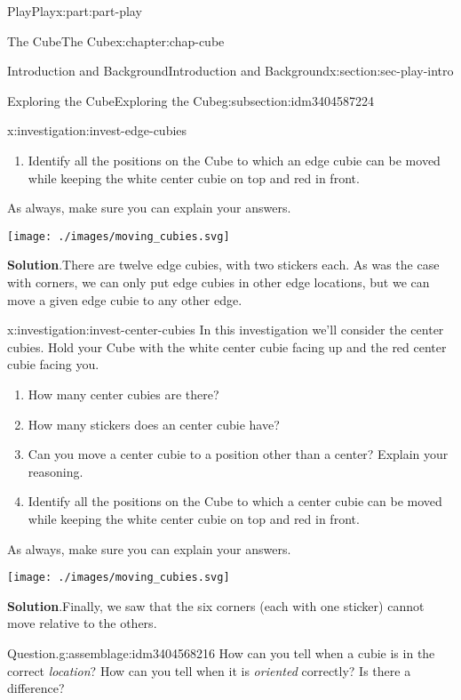 \documentclass[oneside,10pt,]{book}
\newcommand{\blocktitlefont}{\relax}
\numberwithin{equation}{section}
\begin{document}
\begin{partptx}{Play}{}{Play}{}{}{x:part:part-play}
\begin{chapterptx}{The Cube}{}{The Cube}{}{}{x:chapter:chap-cube}
\begin{sectionptx}{Introduction and Background}{}{Introduction and Background}{}{}{x:section:sec-play-intro}
\begin{subsectionptx}{Exploring the Cube}{}{Exploring the Cube}{}{}{g:subsection:idm3404587224}
\begin{investigation}{}{x:investigation:invest-edge-cubies}
\begin{enumerate}
\item{}Identify all the positions on the Cube to which an edge cubie can be moved while keeping the white center cubie on top and red in front.%
\end{enumerate}
As always, make sure you can explain your answers.%
\begin{image}{0.25}{0.5}{0.25}%
\texttt{[image: ./images/moving\_cubies.svg]}
\end{image}%
\par\smallskip%
\noindent\textbf{\blocktitlefont Solution}.\hypertarget{g:solution:idm3404572936}{}\quad{}There are twelve edge cubies, with two stickers each. As was the case with corners, we can only put edge cubies in other edge locations, but we can move a given edge cubie to any other edge.\end{investigation}%
\begin{investigation}{}{x:investigation:invest-center-cubies}%
In this investigation we'll consider the center cubies. Hold your Cube with the white center cubie facing up and the red center cubie facing you.%
\begin{enumerate}
\item{}How many center cubies are there?%
\item{}How many stickers does an center cubie have?%
\item{}Can you move a center cubie to a position other than a center? Explain your reasoning.%
\item{}Identify all the positions on the Cube to which a center cubie can be moved while keeping the white center cubie on top and red in front.%
\end{enumerate}
As always, make sure you can explain your answers.%
\begin{image}{0.25}{0.5}{0.25}%
\texttt{[image: ./images/moving\_cubies.svg]}
\end{image}%
\par\smallskip%
\noindent\textbf{\blocktitlefont Solution}.\hypertarget{g:solution:idm3404568696}{}\quad{}Finally, we saw that the six corners (each with one sticker) cannot move relative to the others.\end{investigation}%
\begin{assemblage}{Question.}{g:assemblage:idm3404568216}%
How can you tell when a cubie is in the correct \emph{location}? How can you tell when it is \emph{oriented} correctly? Is there a difference?\footnotemark{}%
\end{assemblage}
%

\end{subsectionptx}
\end{sectionptx}
\end{chapterptx}
\end{partptx}
\end{document}
